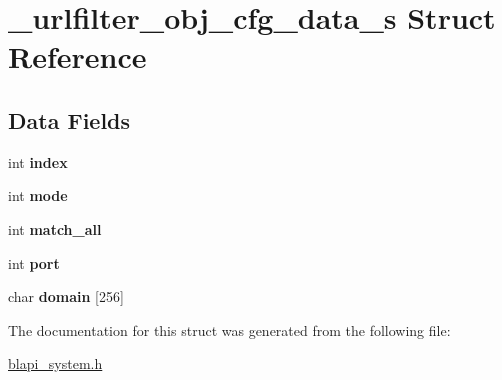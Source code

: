 \hypertarget{struct__urlfilter__obj__cfg__data__s}{}\section{\+\_\+urlfilter\+\_\+obj\+\_\+cfg\+\_\+data\+\_\+s Struct Reference}
\label{struct__urlfilter__obj__cfg__data__s}
\subsection*{Data Fields}
\begin{DoxyCompactItemize}
\item 
\mbox{\label{struct__urlfilter__obj__cfg__data__s_aa2c76dd7f11a3dab80e66a69d792c8b5}} 
int {\bfseries index}
\item 
\mbox{\label{struct__urlfilter__obj__cfg__data__s_ac4d0e5203787ccb44f39f0feeda59208}} 
int {\bfseries mode}
\item 
\mbox{\label{struct__urlfilter__obj__cfg__data__s_ab9c583b2f0eb2694d6c100492d62e4a5}} 
int {\bfseries match\+\_\+all}
\item 
\mbox{\label{struct__urlfilter__obj__cfg__data__s_aaf3dc79d69dcc6b338cef55557c91b40}} 
int {\bfseries port}
\item 
\mbox{\label{struct__urlfilter__obj__cfg__data__s_a15c4d820b47e77ee4383d52955b6aade}} 
char {\bfseries domain} \mbox{[}256\mbox{]}
\end{DoxyCompactItemize}


The documentation for this struct was generated from the following file\+:\begin{DoxyCompactItemize}
\item 
\hyperlink{blapi__system_8h}{blapi\+\_\+system.\+h}\end{DoxyCompactItemize}
